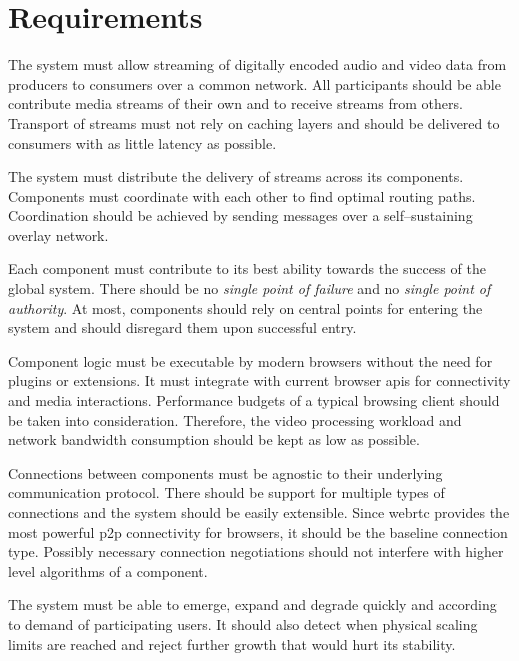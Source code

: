 \section{Requirements}

\begin{enumerate}
The system must allow streaming of digitally encoded audio and video data from producers to consumers over a common network. All participants should be able contribute media streams of their own and to receive streams from others. Transport of streams must not rely on caching layers and should be delivered to consumers with as little latency as possible.

The system must distribute the delivery of streams across its components. Components must coordinate with each other to find optimal routing paths. Coordination should be achieved by sending messages over a self–sustaining overlay network.

Each component must contribute to its best ability towards the success of the global system. There should be no \textit{single point of failure} and no \textit{single point of authority}. At most, components should rely on central points for entering the system and should disregard them upon successful entry.

Component logic must be executable by modern browsers without the need for plugins or extensions. It must integrate with current browser \glspl{api} for connectivity and media interactions. Performance budgets of a typical browsing client should be taken into consideration. Therefore, the video processing workload and network bandwidth consumption should be kept as low as possible.

Connections between components must be agnostic to their underlying communication protocol. There should be support for multiple types of connections and the system should be easily extensible. Since \gls{webrtc} provides the most powerful \gls{p2p} connectivity for browsers, it should be the baseline connection type. Possibly necessary connection negotiations should not interfere with higher level algorithms of a component.

The system must be able to emerge, expand and degrade quickly and according to demand of participating users. It should also detect when physical scaling limits are reached and reject further growth that would hurt its stability.


\end{enumerate}
